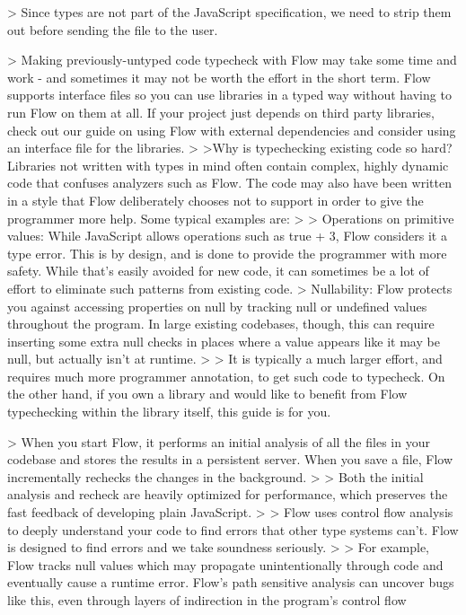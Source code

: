
> Since types are not part of the JavaScript specification, we need to strip them out before sending the file to the user.


> Making previously-untyped code typecheck with Flow may take some time and work - and sometimes it may not be worth the effort in the short term. Flow supports interface files so you can use libraries in a typed way without having to run Flow on them at all. If your project just depends on third party libraries, check out our guide on using Flow with external dependencies and consider using an interface file for the libraries.
>
>Why is typechecking existing code so hard? Libraries not written with types in mind often contain complex, highly dynamic code that confuses analyzers such as Flow. The code may also have been written in a style that Flow deliberately chooses not to support in order to give the programmer more help. Some typical examples are:
>
>    Operations on primitive values: While JavaScript allows operations such as true + 3, Flow considers it a type error. This is by design, and is done to provide the programmer with more safety. While that's easily avoided for new code, it can sometimes be a lot of effort to eliminate such patterns from existing code.
>    Nullability: Flow protects you against accessing properties on null by tracking null or undefined values throughout the program. In large existing codebases, though, this can require inserting some extra null checks in places where a value appears like it may be null, but actually isn't at runtime.
>
> It is typically a much larger effort, and requires much more programmer annotation, to get such code to typecheck. On the other hand, if you own a library and would like to benefit from Flow typechecking within the library itself, this guide is for you.


> When you start Flow, it performs an initial analysis of all the files in your codebase and stores the results in a persistent server. When you save a file, Flow incrementally rechecks the changes in the background.
>
> Both the initial analysis and recheck are heavily optimized for performance, which preserves the fast feedback of developing plain JavaScript.
>
> Flow uses control flow analysis to deeply understand your code to find errors that other type systems can't. Flow is designed to find errors and we take soundness seriously.
>
> For example, Flow tracks null values which may propagate unintentionally through code and eventually cause a runtime error. Flow's path sensitive analysis can uncover bugs like this, even through layers of indirection in the program's control flow

